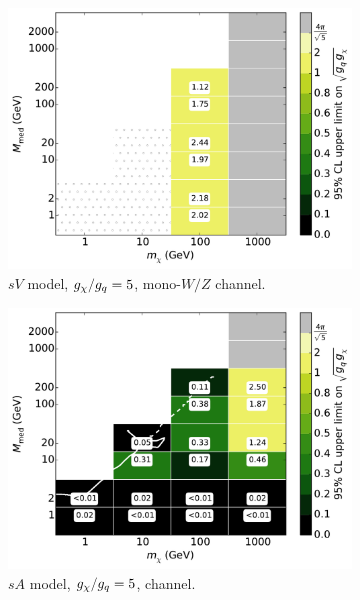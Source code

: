 \begin{figure}
\begin{subfigure}[t]{0.32\textwidth}
    \centering
    \includegraphics[width=1.\textwidth]{figures/grid_basepoints_SVD_rat5_monoWZ.pdf}
    \caption{$sV$ model, $g_{\chi}/g_q = 5$, mono-$W/Z$ channel.}
    \vspace{0.75cm}
  \end{subfigure}
  \begin{subfigure}[t]{0.32\textwidth}
    \centering
    \includegraphics[width=1.\textwidth]{figures/grid_basepoints_SAD_rat5_monojet.pdf}
    \caption{$sA$ model, $g_{\chi}/g_q = 5$, \monojet channel.}
  \end{subfigure}
  \begin{subfigure}[t]{0.32\textwidth}
    \centering

\end{subfigure}
\end{figure}

